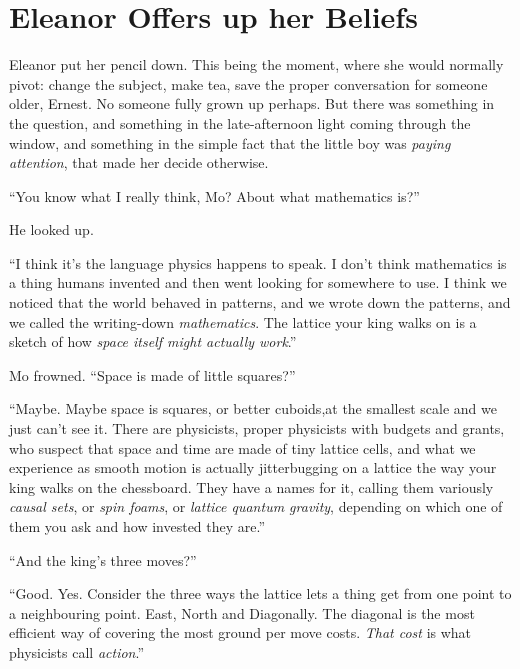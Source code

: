 \chapter*{Eleanor Offers up her Beliefs}
 
Eleanor put her pencil down. This being the moment, where she would normally pivot: change the subject, make tea, save the proper conversation for someone older, Ernest. No someone fully grown up perhaps. But there was something in the question, and something in the late-afternoon light coming through the window, and
something in the simple fact that the little boy was \emph{paying
attention}, that made her decide otherwise.
 
``You know what I really think, Mo? About what mathematics is?''
 
He looked up.
 
``I think it's the language physics happens to speak. I don't think
mathematics is a thing humans invented and then went looking for
somewhere to use. I think we noticed that the world behaved in
patterns, and we wrote down the patterns, and we called the
writing-down \emph{mathematics}. The lattice your king walks on
is a sketch of how \emph{space itself might
actually work}.''
 
Mo frowned. ``Space is made of little squares?''
 
``Maybe. Maybe space is squares, or better cuboids,at the smallest scale and we just
can't see it. There are physicists, proper physicists with budgets and grants, who suspect that space and time are made of tiny lattice cells, and what we experience as smooth motion is actually jitterbugging
on a lattice the way your king walks on the chessboard. They have
a names for it, calling them variously \emph{causal sets}, or \emph{spin foams},
or \emph{lattice quantum gravity}, depending on which one of them you ask and how invested they are.''
 
``And the king's three moves?''
 
``Good. Yes. Consider the three ways the lattice lets a thing get from one point to a neighbouring point. East, North and Diagonally. The diagonal is the most efficient way of covering the most ground per move costs. \emph{That cost} is what physicists call \emph{action}.''
 
